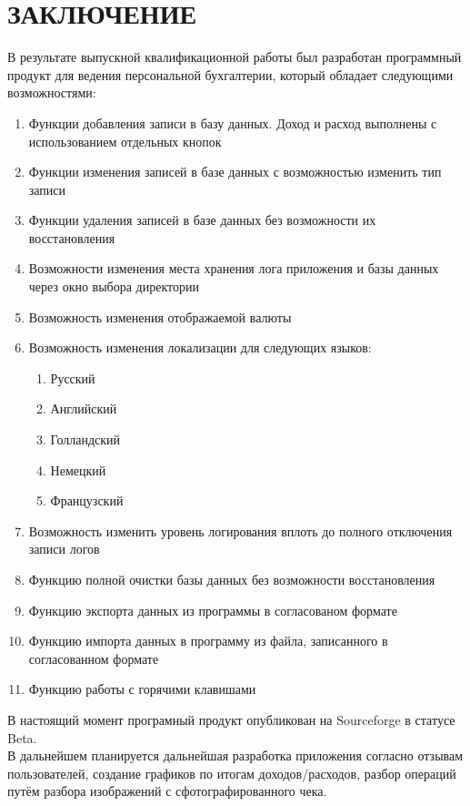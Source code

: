 \documentclass[a4paper,12pt]{article}
\begin{document}
\part*{\centering ЗАКЛЮЧЕНИЕ}
В результате выпускной квалификационной работы был разработан программный продукт для ведения персональной бухгалтерии, который обладает следующими возможностями: 
\begin{enumerate}
	\item Функции добавления записи в базу данных. Доход и расход выполнены с использованием отдельных кнопок
	\item Функции изменения записей в базе данных с возможностью изменить тип записи
	\item Функции удаления записей в базе данных без возможности их восстановления
	\item Возможности изменения места хранения лога приложения и базы данных через окно выбора директории
	\item Возможность изменения отображаемой валюты
	\item Возможность изменения локализации для следующих языков: \begin{enumerate}
		\item Русский
		\item Английский
		\item Голландский
		\item Немецкий
		\item Французский
	\end{enumerate}
	\item Возможность изменить уровень логирования вплоть до полного отключения записи логов
	\item Функцию полной очистки базы данных без возможности восстановления
	\item Функцию экспорта данных из программы в согласованом формате
	\item Функцию импорта данных в программу из файла, записанного в согласованном формате
	\item Функцию работы с горячими клавишами	
\end{enumerate}

В настоящий момент програмный продукт опубликован на Sourceforge\cite{SSBM} в статусе Beta.\\
В дальнейшем планируется дальнейшая разработка приложения согласно отзывам пользователей, создание графиков по итогам доходов/расходов, разбор операций путём разбора изображений с сфотографированного чека.

\pagebreak
\nocite{qtdoc}
\nocite{qt532015}
\nocite{Warren2007}
\printbibliography

\pagebreak

\end{document}
